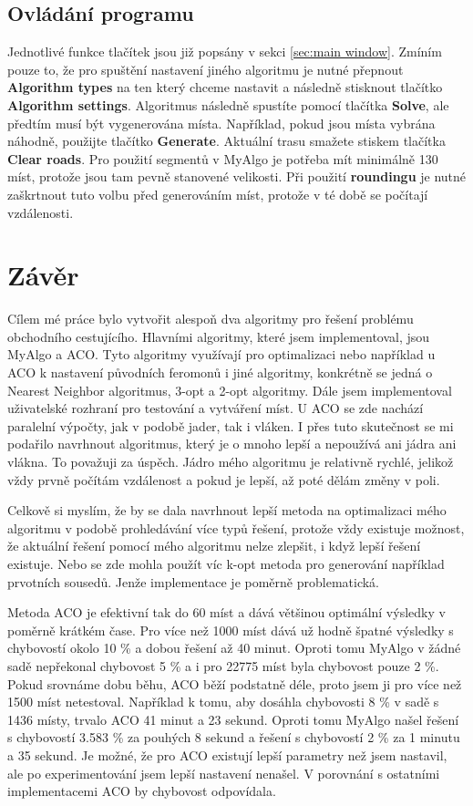 \section{Ovládání programu}
Jednotlivé funkce tlačítek jsou již popsány v sekci \ref{sec:main window}. Zmíním pouze to, že pro spuštění nastavení jiného algoritmu je nutné přepnout \textbf{Algorithm types} na ten který chceme nastavit a následně stisknout tlačítko \textbf{Algorithm settings}. Algoritmus následně spustíte pomocí tlačítka \textbf{Solve}, ale předtím musí být vygenerována místa. Například, pokud jsou místa vybrána náhodně, použijte tlačítko \textbf{Generate}. Aktuální trasu smažete stiskem tlačítka \textbf{Clear roads}. Pro použití segmentů v MyAlgo je potřeba mít minimálně 130 míst, protože jsou tam pevně stanovené velikosti. Při použití \textbf{roundingu} je nutné zaškrtnout tuto volbu před generováním míst, protože v té době se počítají vzdálenosti.

\chapter{Závěr}
Cílem mé práce bylo vytvořit alespoň dva algoritmy pro řešení problému obchodního cestujícího. Hlavními algoritmy, které jsem implementoval, jsou MyAlgo a ACO. Tyto algoritmy využívají pro optimalizaci nebo například u ACO k nastavení původních feromonů i jiné algoritmy, konkrétně se jedná o Nearest Neighbor algoritmus, 3-opt a 2-opt algoritmy. Dále jsem implementoval uživatelské rozhraní pro testování a vytváření míst. U ACO se zde nachází paralelní výpočty, jak v podobě jader, tak i vláken. I přes tuto skutečnost se mi podařilo navrhnout algoritmus, který je o mnoho lepší a nepoužívá ani jádra ani vlákna. To považuji za úspěch. Jádro mého algoritmu je relativně rychlé, jelikož vždy prvně počítám vzdálenost a pokud je lepší, až poté dělám změny v poli.

Celkově si myslím, že by se dala navrhnout lepší metoda na optimalizaci mého algoritmu v podobě prohledávání více typů řešení, protože vždy existuje možnost, že aktuální řešení pomocí mého algoritmu nelze zlepšit, i když lepší řešení existuje. Nebo se zde mohla použít víc k-opt metoda pro generování například prvotních sousedů. Jenže implementace je poměrně problematická.

Metoda ACO je efektivní tak do 60 míst a dává většinou optimální výsledky v poměrně krátkém čase. Pro více než 1000 míst dává už hodně špatné výsledky s chybovostí okolo 10 \% a dobou řešení až 40 minut. Oproti tomu MyAlgo v žádné sadě nepřekonal chybovost 5 \% a i pro 22775 míst byla chybovost pouze 2 \%. Pokud srovnáme dobu běhu, ACO běží podstatně déle, proto jsem ji pro více než 1500 míst netestoval. Například k tomu, aby dosáhla chybovosti 8 \% v sadě s 1436 místy, trvalo ACO 41 minut a 23 sekund. Oproti tomu MyAlgo našel řešení s chybovostí 3.583 \% za pouhých 8 sekund a řešení s chybovostí 2 \% za 1 minutu a 35 sekund. Je možné, že pro ACO existují lepší parametry než jsem nastavil, ale po experimentování jsem lepší nastavení nenašel. V porovnání s ostatními implementacemi ACO by chybovost odpovídala.
